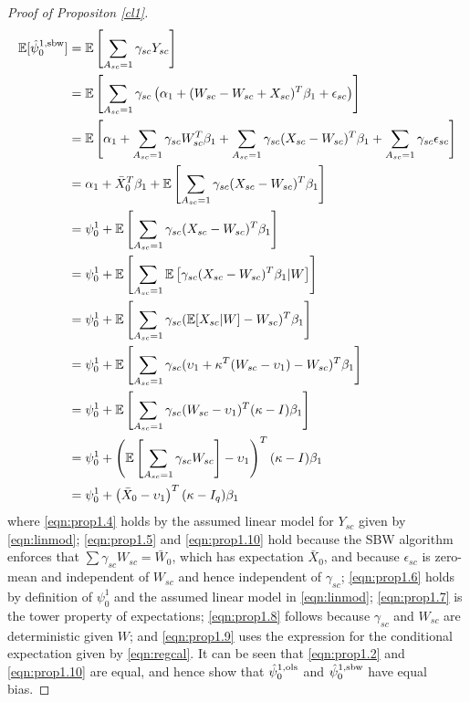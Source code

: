 \documentclass[aoas]{imsart}
\theoremstyle{plain}
\theoremstyle{remark}
\begin{document}
\begin{appendix}
\begin{proof}[Proof of Propositon \ref{cl1}]
\begin{align}
\nonumber	\mathbb{E}[\hat{\psi}_0^{1, \textup{sbw}}] & = \mathbb{E}\left[ \sum_{A_{sc} = 1} {\gamma}_{sc} Y_{sc}\right] \\
	& = \mathbb{E}\left[ \sum_{A_{sc}=1} {\gamma}_{sc} \left(\alpha_1 + (W_{sc} - W_{sc} + X_{sc})^T \beta_1 + \epsilon_{sc}\right)\right] \label{eqn:prop1.4}\\
\nonumber	& = \mathbb{E}\left[ \alpha_1 + \sum_{A_{sc} = 1} {\gamma}_{sc} W_{sc}^T \beta_1 + \sum_{A_{sc}=1} {\gamma}_{sc} (X_{sc} - W_{sc})^T \beta_1 + \sum_{A_{sc}=1} {\gamma}_{sc} \epsilon_{sc} \right] \\
	& = \alpha_1 + \bar{X}_0^T\beta_1 + \mathbb{E}\left[ \sum_{A_{sc} = 1} {\gamma}_{sc}(X_{sc} - W_{sc})^T \beta_1\right] \label{eqn:prop1.5}\\
	& = \psi_0^1 + \mathbb{E} \left[ \sum_{A_{sc} = 1} {\gamma}_{sc}(X_{sc} - W_{sc})^T \beta_1 \right] \label{eqn:prop1.6} \\
	& = \psi_0^1 + \mathbb{E} \left[ \sum_{A_{sc} = 1} \mathbb{E}\left[ {\gamma}_{sc}(X_{sc} - W_{sc})^T \beta_1 | W \right] \right] \label{eqn:prop1.7} \\
	& = \psi_0^1 + \mathbb{E} \left[ \sum_{A_{sc} = 1}  {\gamma}_{sc} (\mathbb{E}[X_{sc}|W] - W_{sc})^T \beta_1 \right] \label{eqn:prop1.8} \\
	& = \psi_0^1 + \mathbb{E} \left[ \sum_{A_{sc} = 1}  {\gamma}_{sc} (\upsilon_1 + \kappa^T(W_{sc} - \upsilon_1) - W_{sc})^T \beta_1 \right] \label{eqn:prop1.9} \\
\nonumber	& = \psi_0^1 + \mathbb{E} \left[ \sum_{A_{sc} = 1}  {\gamma}_{sc} (W_{sc} - \upsilon_1)^T(\kappa - I)\beta_1 \right] \\
\nonumber	& = \psi_0^1 + \left(\mathbb{E}\left[\sum_{A_{sc} = 1} {\gamma}_{sc} W_{sc}\right] - \upsilon_1\right)^T(\kappa - I)\beta_1  \\
	& = \psi_0^1 + \left(\bar{X}_0 - \upsilon_1\right)^T(\kappa - I_q)\beta_1  \label{eqn:prop1.10}
\end{align}
%
where \eqref{eqn:prop1.4} holds by the assumed linear model for $Y_{sc}$ given by  \eqref{eqn:linmod}; \eqref{eqn:prop1.5} and \eqref{eqn:prop1.10} hold because the SBW algorithm enforces that $\sum \gamma_{sc} W_{sc} = \bar{W}_0$, which has expectation $\bar{X}_0$, and because $\epsilon_{sc}$ is zero-mean and independent of $W_{sc}$ and hence independent of $\gamma_{sc}$; \eqref{eqn:prop1.6} holds by definition of $\psi_0^1$ and the assumed linear model in \eqref{eqn:linmod}; \eqref{eqn:prop1.7} is the tower property of expectations; \eqref{eqn:prop1.8} follows because $\gamma_{sc}$ and $W_{sc}$ are deterministic given $W$; and \eqref{eqn:prop1.9} uses the expression for the conditional expectation given by \eqref{eqn:regcal}. It can be seen that \eqref{eqn:prop1.2} and \eqref{eqn:prop1.10} are equal, and hence show that $\hat{\psi}_0^{1,\textup{ols}}$ and $\hat{\psi}_0^{1, \textup{sbw}}$ have equal bias.


\end{proof}
\end{appendix}
\end{document}
